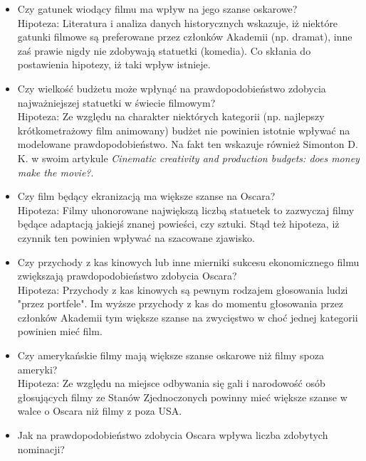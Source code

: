 \begin{itemize}
    \item Czy gatunek wiodący filmu ma wpływ na jego szanse oskarowe? \vspace{0.2cm}\\
Hipoteza: Literatura i analiza danych historycznych wskazuje, iż niektóre gatunki filmowe są preferowane przez członków Akademii (np. dramat), inne zaś prawie nigdy nie zdobywają statuetki (komedia). Co skłania do postawienia hipotezy, iż taki wpływ  istnieje.
  \item Czy wielkość budżetu może wpłynąć na prawdopodobieństwo zdobycia najważniejszej statuetki w świecie filmowym? \vspace{0.2cm}\\
Hipoteza: Ze względu na charakter niektórych kategorii (np. najlepszy krótkometrażowy film animowany) budżet nie powinien istotnie wpływać na modelowane prawdopodobieństwo. Na fakt ten wskazuje również Simonton D. K. w swoim artykule \textit{Cinematic creativity and production budgets: does money make the movie?}\cite{simonton05}.
  \item Czy film będący ekranizacją ma większe szanse na Oscara? \vspace{0.2cm}\\
Hipoteza: Filmy uhonorowane największą liczbą statuetek to zazwyczaj filmy będące adaptacją jakiejś znanej powieści, czy sztuki. Stąd też hipoteza, iż czynnik ten powinien wpływać na szacowane zjawisko.  
  \item Czy przychody z kas kinowych lub inne mierniki sukcesu ekonomicznego filmu zwiększają prawdopodobieństwo zdobycia Oscara?  \vspace{0.2cm}\\
Hipoteza: Przychody z kas kinowych są pewnym rodzajem głosowania ludzi "przez portfele". Im wyższe przychody z kas do momentu głosowania przez członków Akademii tym większe szanse na zwycięstwo w choć jednej kategorii powinien mieć film.
  \item Czy amerykańskie filmy mają większe szanse oskarowe niż filmy spoza ameryki?  \vspace{0.2cm}\\
Hipoteza: Ze względu na miejsce odbywania się gali i narodowość osób głosujących filmy ze Stanów Zjednoczonych powinny mieć większe szanse w walce o Oscara niż filmy z poza USA.
  \item Jak na prawdopodobieństwo zdobycia Oscara wpływa liczba zdobytych nominacji? \vspace{0.2cm}\\

\end{itemize}

